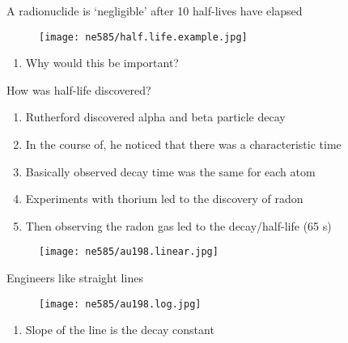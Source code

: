 \documentclass[aspectratio=1610,pdftex,dvipsnames,compress,xcolor={dvipsnames}]{beamer}
\begin{document}
\begin{frame}{A radionuclide is `negligible' after 10 half-lives have elapsed}

    \begin{figure}
        \centering
        \texttt{[image: ne585/half.life.example.jpg]}
    \end{figure}

    \vspace*{\fill}

    \begin{enumerate}[series=outerlist,topsep=0pt,itemsep=21pt,leftmargin=*,label=(\arabic*)]
        \item[]Why would this be important?
    \end{enumerate}
\end{frame}


\begin{frame}{How was half-life discovered?}
    \begin{enumerate}[series=outerlist,topsep=0pt,itemsep=21pt,leftmargin=*,label=(\arabic*)]
        \item[]Rutherford discovered alpha and beta particle decay
        \item[]In the course of, he noticed that there was a characteristic time
        \item[]Basically observed decay time was the same for each atom
        \item[]Experiments with thorium led to the discovery of radon
        \item[]Then observing the radon gas led to the decay/half-life (65 s)
    \end{enumerate}
\end{frame}


\begin{frame}{}
    \begin{figure}
        \centering
        \texttt{[image: ne585/au198.linear.jpg]}
    \end{figure}
\end{frame}


\begin{frame}{Engineers like straight lines}
    \begin{figure}
        \centering
        \texttt{[image: ne585/au198.log.jpg]}
    \end{figure}

    \vspace*{\fill}

    \begin{enumerate}[series=outerlist,topsep=0pt,itemsep=21pt,leftmargin=*,label=(\arabic*)]
        \item[]Slope of the line is the decay constant
    \end{enumerate}
\end{frame}
\end{document}
